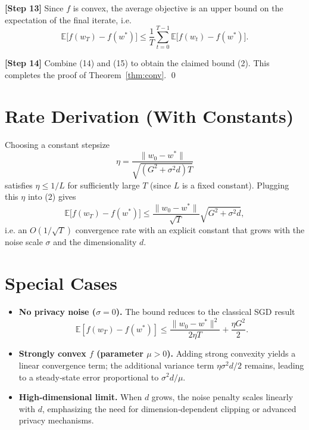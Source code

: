\documentclass{article}
\newcommand{\E}{\mathbb{E}}
\begin{document}
\noindent\textbf{[Step 13]}  Since $f$ is convex, the average objective is an upper bound on the expectation of the final iterate, i.e.
\[
\E\!\big[f(w_T)-f(w^{*})\big]\le
\frac{1}{T}\sum_{t=0}^{T-1}\E\!\big[f(w_t)-f(w^{*})\big].
\tag{15}
\]

\noindent\textbf{[Step 14]}  Combine (14) and (15) to obtain the claimed bound (2).  This completes the proof of Theorem~\ref{thm:conv}. \qed

\section*{Rate Derivation (With Constants)}
Choosing a constant stepsize
\[
\eta = \frac{\|w_0-w^{*}\|}{\sqrt{(G^{2}+\sigma^{2}d)T}}
\]
satisfies $\eta\le 1/L$ for sufficiently large $T$ (since $L$ is a fixed constant).  
Plugging this $\eta$ into (2) gives
\[
\E\!\big[f(w_T)-f(w^{*})\big]
\le
\frac{\|w_0-w^{*}\|}{\sqrt{T}}\sqrt{G^{2}+\sigma^{2}d},
\]
i.e. an $O(1/\sqrt{T})$ convergence rate with an explicit constant that grows with the noise scale $\sigma$ and the dimensionality $d$.

\section*{Special Cases}
\begin{itemize}
\item \textbf{No privacy noise ($\sigma=0$).}  The bound reduces to the classical SGD result
\[
\E[f(w_T)-f(w^{*})]\le \frac{\|w_0-w^{*}\|^{2}}{2\eta T}+\frac{\eta G^{2}}{2}.
\]

\item \textbf{Strongly convex $f$ (parameter $\mu>0$).}  Adding strong convexity yields a linear convergence term; the additional variance term $\eta\sigma^{2}d/2$ remains, leading to a steady‑state error proportional to $\sigma^{2}d/\mu$.

\item \textbf{High‑dimensional limit.}  When $d$ grows, the noise penalty scales linearly with $d$, emphasizing the need for dimension‑dependent clipping or advanced privacy mechanisms.
\end{itemize}
\end{document}
